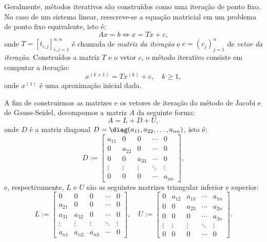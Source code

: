 Geralmente, métodos iterativos são construídos como uma iteração de ponto fixo. No caso de um sistema linear, reescreve-se a equação matricial em um problema de ponto fixo equivalente, isto é:
\begin{equation}
  Ax = b \Leftrightarrow x = Tx + c,
\end{equation}
onde $T = [t_{i,j}]_{i,j=1}^{n,n}$ é chamada de \emph{matriz da iteração} e $c = (c_j)_{j=1}^n$ de \emph{vetor da iteração}. Construídos a matriz $T$ e o vetor $c$, o método iterativo consiste em computar a iteração:
\begin{equation}
  x^{(k+1)} = Tx^{(k)} + c,\quad k\geq 1,
\end{equation}
onde $x^{(1)}$ é uma aproximação inicial dada.

A fim de construirmos as matrizes e os vetores de iteração do método de Jacobi e de Gauss-Seidel, decompomos a matriz $A$ da seguinte forma:
\begin{equation}
  A = L + D + U,
\end{equation}
onde $D$ é a matriz diagonal $D = \diag(a_{11}, a_{22}, \ldots, a_{nn})$, isto é:
\begin{equation}
  D := \begin{bmatrix}
    a_{11} & 0 & 0 & \cdots & 0\\
    0 & a_{22} & 0 & \cdots & 0\\
    0 & 0 & a_{33} & \cdots & 0\\
    \vdots & \vdots & \vdots & \ddots & \vdots\\
    0 & 0 & 0 & \cdots & a_{nn}
  \end{bmatrix},
\end{equation}
e, respectivamente, $L$ e $U$ são as seguintes matrizes triangular inferior e superior:
\begin{equation}
  L := \begin{bmatrix}
    0 & 0 & 0 & \cdots & 0\\
    a_{21} & 0 & 0 & \cdots & 0\\
    a_{31} & a_{32} & 0 &\cdots & 0\\
    \vdots & \vdots & \vdots & \ddots & \vdots\\
    a_{n1} & a_{n2} & a_{n3} & \cdots & 0
  \end{bmatrix},\quad
  U := \begin{bmatrix}
    0 & a_{12} & a_{13} & \cdots & a_{1n}\\
    0 & 0 & a_{23} & \cdots & a_{2n}\\
    0 & 0 & 0 & \cdots & a_{3n}\\
    \vdots & \vdots & \vdots & \ddots & \vdots\\
    0 & 0 & 0 & \cdots & 0
  \end{bmatrix}.
\end{equation}

